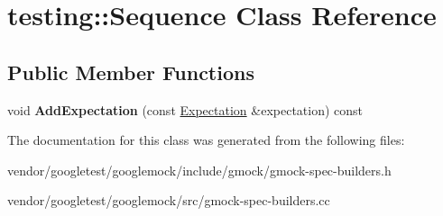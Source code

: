 \hypertarget{classtesting_1_1_sequence}{}\section{testing\+:\+:Sequence Class Reference}
\label{classtesting_1_1_sequence}
\subsection*{Public Member Functions}
\begin{DoxyCompactItemize}
\item 
\mbox{\label{classtesting_1_1_sequence_ac5b77b3b5b2e229ccbc13be1f3d17a9c}} 
void {\bfseries Add\+Expectation} (const \hyperlink{classtesting_1_1_expectation}{Expectation} \&expectation) const
\end{DoxyCompactItemize}


The documentation for this class was generated from the following files\+:\begin{DoxyCompactItemize}
\item 
vendor/googletest/googlemock/include/gmock/gmock-\/spec-\/builders.\+h\item 
vendor/googletest/googlemock/src/gmock-\/spec-\/builders.\+cc\end{DoxyCompactItemize}
